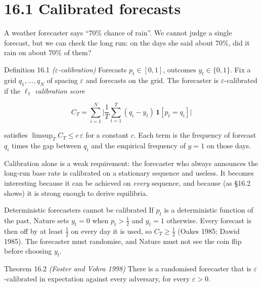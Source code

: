 \documentclass[11pt,a4paper,openany]{book}
\newcommand{\eps}{\varepsilon}
\newcommand{\ind}{\mathbf{1}}
\begin{document}
\section*{16.1 Calibrated forecasts}\label{ch16-cal}

A weather forecaster says ``70\% chance of rain''. We cannot judge a single forecast, but we can check the long run: on the days she said about 70\%, did it rain on about 70\% of them?

\begin{bdef}{Definition 16.1 \emph{($\eps$-calibration)}}
Forecasts $p_t\in[0,1]$, outcomes $y_t\in\{0,1\}$. Fix a grid $q_1,\dots,q_N$ of spacing $\eps$ and forecasts on the grid. The forecaster is $\eps$-calibrated if the \emph{$\ell_1$ calibration score}

\[C_T=\sum_{i=1}^N\Big\lvert\frac1T\sum_{t=1}^T(q_i-y_t)\,\ind[p_t=q_i]\Big\rvert\]

satisfies $\limsup_TC_T\le c\,\eps$ for a constant $c$. Each term is the frequency of forecast $q_i$ times the gap between $q_i$ and the empirical frequency of $y=1$ on those days.
\end{bdef}

Calibration alone is a weak requirement: the forecaster who always announces the long-run base rate is calibrated on a stationary sequence and useless. It becomes interesting because it can be achieved on \emph{every} sequence, and because (as §16.2 shows) it is strong enough to derive equilibria.

\begin{bwarn}{Deterministic forecasters cannot be calibrated}
If $p_t$ is a deterministic function of the past, Nature sets $y_t=0$ when $p_t>\tfrac12$ and $y_t=1$ otherwise. Every forecast is then off by at least $\tfrac12$ on every day it is used, so $C_T\ge\tfrac12$ (Oakes 1985; Dawid 1985). The forecaster must randomise, and Nature must not see the coin flip before choosing $y_t$.
\end{bwarn}

\begin{bthm}{Theorem 16.2 \emph{(Foster and Vohra 1998)}}
There is a randomised forecaster that is $\eps$-calibrated in expectation against every adversary, for every $\eps>0$.
\end{bthm}
\end{document}
